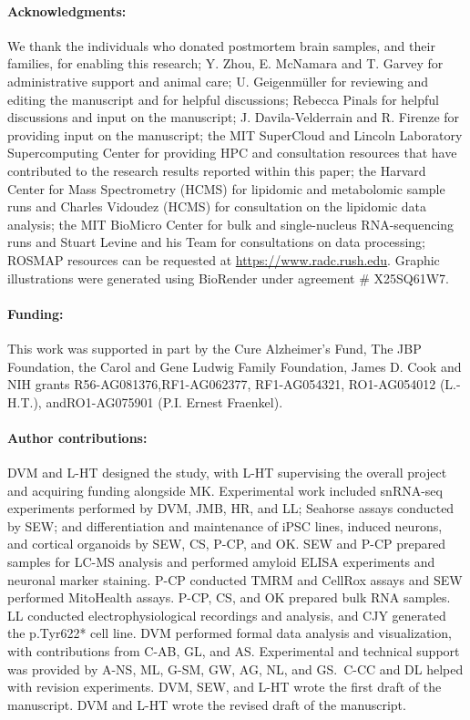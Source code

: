 \paragraph{Acknowledgments:} We thank the individuals who donated postmortem brain samples, and their families, for enabling this research; Y. Zhou, E. McNamara and T. Garvey for administrative support and animal care; U. Geigenmüller for reviewing and editing the manuscript and for helpful discussions; Rebecca Pinals for helpful discussions and input on the manuscript; J. Davila-Velderrain and R. Firenze for providing input on the manuscript; the MIT SuperCloud and Lincoln Laboratory Supercomputing Center for providing HPC and consultation resources that have contributed to the research results reported within this paper; the Harvard Center for Mass Spectrometry (HCMS) for lipidomic and metabolomic sample runs and Charles Vidoudez (HCMS) for consultation on the lipidomic data analysis; the MIT BioMicro Center for bulk and single-nucleus RNA-sequencing runs and Stuart Levine and his Team for consultations on data processing; ROSMAP resources can be requested at \url{https://www.radc.rush.edu}. Graphic illustrations were generated using BioRender under agreement \# X25SQ61W7.

\paragraph{Funding:} This work was supported in part by the Cure Alzheimer’s Fund, The JBP Foundation, the Carol and Gene Ludwig Family Foundation, James D. Cook and NIH grants R56-AG081376,RF1-AG062377, RF1-AG054321, RO1-AG054012 (L.-H.T.), andRO1-AG075901 (P.I. Ernest Fraenkel).

\paragraph{Author contributions:} DVM and L-HT designed the study, with L-HT supervising the overall project and acquiring funding alongside MK. Experimental work included snRNA-seq experiments performed by DVM, JMB, HR, and LL; Seahorse assays conducted by SEW; and differentiation and maintenance of iPSC lines, induced neurons, and cortical organoids by SEW, CS, P-CP, and OK. SEW and P-CP prepared samples for LC-MS analysis and performed amyloid ELISA experiments and neuronal marker staining. P-CP conducted TMRM and CellRox assays and SEW performed MitoHealth assays. P-CP, CS, and OK prepared bulk RNA samples. LL conducted electrophysiological recordings and analysis, and CJY generated the p.Tyr622* cell line. DVM performed formal data analysis and visualization, with contributions from C-AB, GL, and AS. Experimental and technical support was provided by A-NS, ML, G-SM, GW, AG, NL, and GS. C-CC and DL helped with revision experiments. DVM, SEW, and L-HT wrote the first draft of the manuscript. DVM and L-HT wrote the revised draft of the manuscript.

